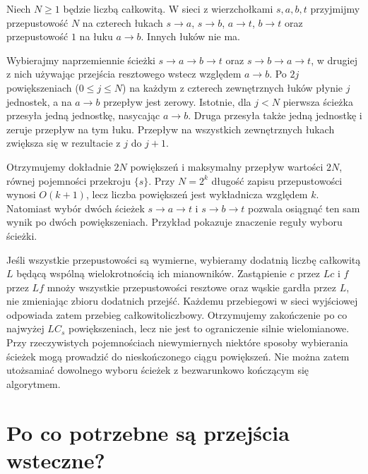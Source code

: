 \begin{przyklad}
\label{ex:tg-flow-ff-pseudopoly}
Niech $N\geq1$ będzie liczbą całkowitą. W sieci
z wierzchołkami $s,a,b,t$ przyjmijmy przepustowość
$N$ na czterech łukach $s\to a$, $s\to b$,
$a\to t$, $b\to t$ oraz przepustowość $1$
na łuku $a\to b$. Innych łuków nie ma.

Wybierajmy naprzemiennie ścieżki $s\to a\to b\to t$
oraz $s\to b\to a\to t$, w drugiej z nich używając
przejścia resztowego wstecz względem $a\to b$.
Po $2j$ powiększeniach ($0\leq j\leq N$) na każdym
z czterech zewnętrznych łuków płynie $j$ jednostek,
a na $a\to b$ przepływ jest zerowy. Istotnie, dla
$j<N$ pierwsza ścieżka przesyła jedną jednostkę,
nasycając $a\to b$. Druga przesyła także jedną
jednostkę i zeruje przepływ na tym łuku.
Przepływ na wszystkich zewnętrznych łukach zwiększa
się w rezultacie z $j$ do $j+1$.

Otrzymujemy dokładnie $2N$ powiększeń i maksymalny
przepływ wartości $2N$, równej pojemności przekroju
$\{s\}$. Przy $N=2^k$ długość zapisu przepustowości
wynosi $O(k+1)$, lecz liczba powiększeń jest
wykładnicza względem $k$. Natomiast wybór dwóch
ścieżek $s\to a\to t$ i $s\to b\to t$ pozwala
osiągnąć ten sam wynik po dwóch powiększeniach.
Przykład pokazuje znaczenie reguły wyboru ścieżki.
\end{przyklad}

\begin{uwaga}
Jeśli wszystkie przepustowości są wymierne,
wybieramy dodatnią liczbę całkowitą $L$ będącą
wspólną wielokrotnością ich mianowników.
Zastąpienie $c$ przez $Lc$ i $f$ przez $Lf$
mnoży wszystkie przepustowości resztowe oraz
wąskie gardła przez $L$, nie zmieniając zbioru
dodatnich przejść. Każdemu przebiegowi w sieci
wyjściowej odpowiada zatem przebieg całkowitoliczbowy.
Otrzymujemy zakończenie po co najwyżej $LC_s$
powiększeniach, lecz nie jest to ograniczenie
silnie wielomianowe.
Przy rzeczywistych pojemnościach niewymiernych
niektóre sposoby wybierania ścieżek
mogą prowadzić do nieskończonego ciągu powiększeń.
Nie można zatem utożsamiać dowolnego wyboru ścieżek
z bezwarunkowo kończącym się algorytmem.

\end{uwaga}

\section{Po co potrzebne są przejścia wsteczne?}
\label{sec:tg-flow-backward}

